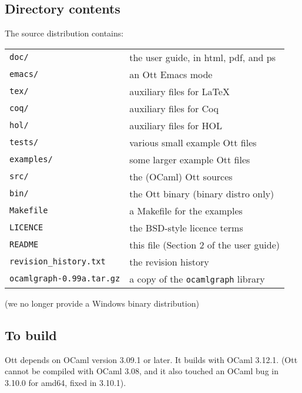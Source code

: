 \mydummy{             }


\subsection{Directory contents}
\mydummy{----------------}
The source distribution contains:\par\noindent
\begin{tabular}{ll}
\texttt{doc/}&                    the user guide, in html, pdf, and ps \\
\texttt{emacs/}&                  an Ott Emacs mode\\
\texttt{tex/}&                    auxiliary files for LaTeX\\
\texttt{coq/}&                    auxiliary files for Coq\\
\texttt{hol/}&                    auxiliary files for HOL\\
\texttt{tests/}&                  various small example Ott files\\
\texttt{examples/}&               some larger example Ott files\\
\texttt{src/}&                    the (OCaml) Ott sources\\
\texttt{bin/}&                    the Ott binary (binary distro only)\\
\texttt{Makefile} &               a Makefile for the examples\\
\texttt{LICENCE}&                 the BSD-style licence terms\\
\texttt{README}&                  this file (Section 2 of the user guide)\\
\texttt{revision\_history.txt}&                  the revision history\\
\texttt{ocamlgraph-0.99a.tar.gz}&  a copy of the \texttt{ocamlgraph} library
\end{tabular}\par\noindent
(we no longer provide a Windows binary distribution)


\subsection{To build}
\mydummy{--------}
Ott depends on OCaml version 3.09.1 or later.  It builds with OCaml
3.12.1.  (Ott cannot be
compiled with OCaml 3.08, and it also touched an OCaml bug in 3.10.0 for amd64,
fixed in 3.10.1).



